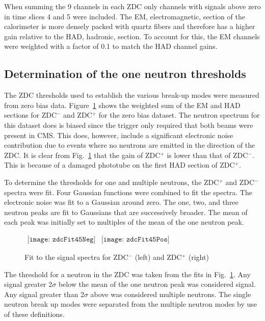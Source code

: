       When summing the 9 channels in each ZDC only channels with signals above 
        zero in time slices 4 and 5 were included. 
      The EM, electromagnetic, section of the calorimeter is more densely 
        packed with quartz fibers and therefore has a higher gain relative to 
        the HAD, hadronic, section. 
      To account for this, the EM channels were weighted with
        a factor of 0.1 to match the HAD channel gains.

    \subsection{Determination of the one neutron thresholds}
      The ZDC thresholds used to establish the various break-up modes were 
        measured from zero bias data.
      Figure~\ref{fig:zdcM2Fit} shows the weighted sum of the EM and 
        HAD sections for  ZDC$^{-}$ and  ZDC$^{+}$ for the zero bias 
        dataset.
      The neutron spectrum for this dataset does is biased since the 
        trigger only required that both beams were present in CMS. 
      This does, however, include a significant electronic noise contribution due
        to events where no neutrons are emitted in the direction of the ZDC.
      It is clear from Fig.~\ref{fig:zdcM2Fit} that the gain of  
        ZDC$^{+}$ is lower than that of ZDC$^{-}$. 
      This is because of a damaged phototube on the first HAD section 
        of ZDC$^{+}$.

      To determine the thresholds for one and multiple neutrons, the ZDC$^{+}$ 
        and ZDC$^{-}$ spectra were fit.
      Four Gaussian functions were combined to fit the spectra. 
      The electronic noise was fit to a Gaussian around zero.
      The one, two, and three neutron peaks are fit to Gaussians that are 
        successively broader.
      The mean of each peak was initially set to multiples of the mean of the 
        one neutron peak. 
      \begin{figure}[!Hh]
        \centering
        $ 
          \begin{array}{cc}
            \texttt{[image: zdcFit45Neg]} &
            \texttt{[image: zdcFit45Pos]}
          \end{array} 
        $
        \caption{Fit to the signal spectra for ZDC$^{-}$ (left) and ZDC$^{+}$ 
          (right)}
        \label{fig:zdcM2Fit}
      \end{figure}
      The threshold for a neutron in the ZDC was taken from the fits in 
        Fig.~\ref{fig:zdcM2Fit}.
      Any signal greater 2$\sigma$ below the mean of the one neutron peak was 
        considered signal.
      Any signal greater than 2$\sigma$ above was considered multiple 
        neutrons.
      The single neutron break up modes were separated from the multiple 
        neutron modes by use of these definitions.

